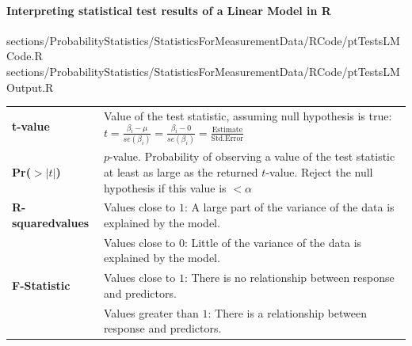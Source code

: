 {		\paragraph{Interpreting statistical test results of a Linear Model in R}
			\RExample
			{
				sections/ProbabilityStatistics/StatisticsForMeasurementData/RCode/ptTestsLMCode.R
			}
			{
				sections/ProbabilityStatistics/StatisticsForMeasurementData/RCode/ptTestsLMOutput.R
			}
			{
				\begin{tabular}{>{\bfseries}p{}p{}}
					t-value
						& Value of the test statistic, assuming null hypothesis is true: $t = \frac{\beta_i - \mu}{se(\beta_i)}= \frac{\beta_i - 0}{se(\beta_i)} = \frac{\mathrm{Estimate}}{\mathrm{Std. Error}}$\\
					Pr($>|t|$)
						& $p$-value. Probability of observing a value of the test statistic at least as large as the returned $t$-value. Reject the null hypothesis if this value is $<\alpha$\\
					R-squared\newline values
						& Values close to $1$: A large part of the variance of the data is explained by the model.\\
						& Values close to $0$: Little of the variance of the data is explained by the model.\\
					F-Statistic
						& Values close to $1$: There is no relationship between response and predictors.\\
						& Values greater than $1$: There is a relationship between response and predictors.\\
				\end{tabular}
			}
	}